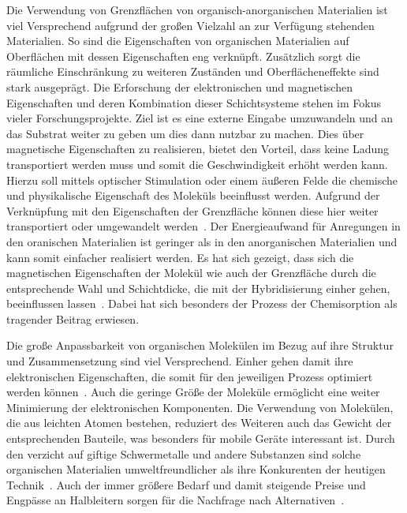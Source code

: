     Die Verwendung von Grenzflächen von organisch-anorganischen Materialien ist viel Versprechend aufgrund der großen Vielzahl an zur Verfügung stehenden Materialien.
    So sind die Eigenschaften von organischen Materialien auf Oberflächen mit dessen Eigenschaften eng verknüpft.
    Zusätzlich sorgt die räumliche Einschränkung zu weiteren Zuständen und Oberflächeneffekte sind stark ausgeprägt.
    Die Erforschung der elektronischen und magnetischen Eigenschaften und deren Kombination dieser Schichtsysteme stehen im Fokus vieler Forschungsprojekte.
    Ziel ist es eine externe Eingabe umzuwandeln und an das Substrat weiter zu geben um dies dann nutzbar zu machen.
    Dies über magnetische Eigenschaften zu realisieren, bietet den Vorteil, dass keine Ladung transportiert werden muss und somit die Geschwindigkeit erhöht werden kann.
    Hierzu soll mittels optischer Stimulation oder einem äußeren Felde die chemische und physikalische Eigenschaft des Moleküls beeinflusst werden.
    Aufgrund der Verknüpfung mit den Eigenschaften der Grenzfläche können diese hier weiter transportiert oder umgewandelt werden~\cite{IF_16}.
    Der Energieaufwand für Anregungen in den oranischen Materialien ist geringer als in den anorganischen Materialien und kann somit einfacher realisiert werden.
    Es hat sich gezeigt, dass sich die magnetischen Eigenschaften der Molekül wie auch der Grenzfläche durch die entsprechende Wahl und Schichtdicke, die mit der Hybridisierung einher gehen, beeinflussen lassen~\cite{IF_16}.
    Dabei hat sich besonders der Prozess der Chemisorption als tragender Beitrag erwiesen.

    Die große Anpassbarkeit von organischen Molekülen im Bezug auf ihre Struktur und Zusammensetzung sind viel Versprechend.
    Einher gehen damit ihre elektronischen Eigenschaften, die somit für den jeweiligen Prozess optimiert werden können~\cite{scholl_chapter_2018}.
    Auch die geringe Größe der Moleküle ermöglicht eine weiter Minimierung der elektronischen Komponenten.
    Die Verwendung von Molekülen, die aus leichten Atomen bestehen, reduziert des Weiteren auch das Gewicht der entsprechenden Bauteile, was besonders für mobile Geräte interessant ist.
    Durch den verzicht auf giftige Schwermetalle und andere Substanzen sind solche organischen Materialien umweltfreundlicher als ihre Konkurenten der heutigen Technik~\cite{scholl_chapter_2018}.
    Auch der immer größere Bedarf und damit steigende Preise und Engpässe an Halbleitern sorgen für die Nachfrage nach Alternativen~\cite{Idealo}.

